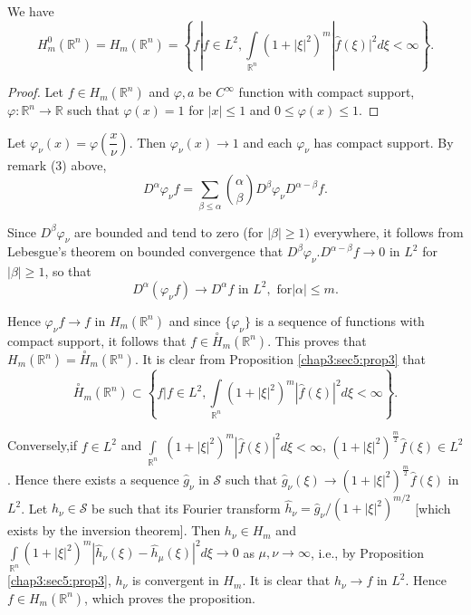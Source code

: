 \begin{proposition}\label{chap3:sec5:prop4}%
  We have 
  $$
  H_{m}^0 (\mathbb{R}^n) = H_m (\mathbb{R}^n) = \left\{f | f \in
  L^2, \int\limits_{\mathbb{R}^n} (1+ | \xi |^2 )^m | \hat{f} (\xi )
  |^2 d \xi < \infty \right\}.
  $$ 
\end{proposition}

\begin{proof}
  Let $f \in H_m (\mathbb{R}^n)$ and $\varphi, a $ be $C^\infty$
  function with compact support, $\varphi : \mathbb{R}^n \to
  \mathbb{R}$ such that $\varphi (x) = 1$ for $| x | \le 1$ and $0 \le
  \varphi (x) \le 1$. 
\end{proof}

Let $\varphi_\nu (x) = \varphi \left(\dfrac{x}{\nu}\right)$. Then $\varphi_\nu
(x) \to 1$ and each $\varphi_\nu$ has compact support. By remark (3)
above, 
$$
D^\alpha \varphi_\nu f = \sum_{\beta \le \alpha} \binom{\alpha}{\beta}
D^\beta \varphi_\nu D^{\alpha - \beta} f.  
$$

Since $D^\beta \varphi_\nu$ are bounded and tend to zero (for $|
\beta | \ge 1)$ everywhere, it follows from Lebesgue's theorem on
bounded convergence that $D^\beta \varphi_\nu . D^{\alpha - \beta } f
\to 0$ in $L^2$ for $| \beta | \ge 1$, so that  
$$
D^\alpha (\varphi_\nu f) \to D^\alpha f \text { in } L^2, \text { for
} | \alpha | \le m. 
$$

Hence $\varphi_\nu f \to f$ in $H_m (\mathbb{R}^n)$ and since
$\{\varphi_\nu\}$ is a sequence of functions with compact support, it
follows that $f \in \overset{\circ}{H}_m (\mathbb{R}^n)$. This proves that
$H_m (\mathbb{R}^n) = \overset{\circ}{H}_m (\mathbb{R}^n)$. It is clear
from Proposition \ref{chap3:sec5:prop3}  that  
$$
\overset{\circ}{H}_m (\mathbb{R}^n) \subset \left\{f \big | f \in L^2,
\int\limits_{\mathbb{R}^n} (1+ | \xi |^2 )^m | \hat{f} (\xi ) |^2 d
\xi < \infty \right\}.  
$$

Conversely,\pageoriginale if $f \in L^2 $ and $\int\limits_{\mathbb{R}^n}$ $(1+ |
\xi |^2)^m | \hat{f} (\xi) |^2 d \xi < \infty$, $(1+|\xi|^2)^{\frac{m}{2}}
\hat{f} (\xi ) \in L^2$. Hence there exists a sequence $\hat{g}_\nu$
in $\mathscr{S}$ such that $\hat{g}_\nu (\xi) \to (1+ | \xi
|^2)^{\frac{m}{2}} \hat{f} (\xi)$ in $L^2$. Let $h_\nu \in
\mathscr{S}$ be such that its Fourier transform $\hat{h}_\nu =
\hat{g}_\nu \big / (1+ | \xi |^2)^{m/2}$ [which exists by the
  inversion theorem]. Then $h_\nu \in H_m$ and
$\int\limits_{\mathbb{R}^n} (1+ | \xi |^2 )^m | \hat {h}_\nu (\xi )-
\hat{h}_\mu (\xi) |^2 d \xi \to 0$ as $\mu, \nu \to \infty$, i.e., by
Proposition \ref{chap3:sec5:prop3}, $h_\nu$ is convergent in $H_m$. It
is clear that 
$h_\nu \to f$ in $L^2$. Hence $f \in H_m (\mathbb{R}^n)$, which proves
the proposition.  

